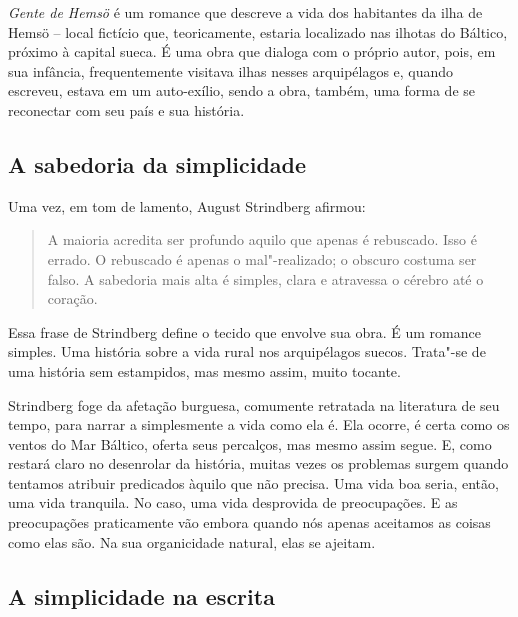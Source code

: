 \documentclass[12pt]{extarticle}
\begin{document}
\emph{Gente de Hemsö} é um romance que descreve a vida dos habitantes da 
ilha de Hemsö -- local fictício que, teoricamente, estaria localizado nas
ilhotas do Báltico, próximo à capital sueca. É uma obra que dialoga com
o próprio autor, pois, em sua infância, frequentemente visitava ilhas
nesses arquipélagos e, quando escreveu, estava em um auto-exílio, sendo
a obra, também, uma forma de se reconectar com seu país e sua história.




\subsection{A sabedoria da simplicidade}

Uma vez, em tom de lamento, August Strindberg afirmou:

\begin{quote}
A maioria acredita ser profundo aquilo que apenas é rebuscado. Isso é
errado. O rebuscado é apenas o mal"-realizado; o obscuro costuma ser
falso. A sabedoria mais alta é simples, clara e atravessa o cérebro até
o coração.
\end{quote}

Essa frase de Strindberg define o tecido que envolve sua obra. É um
romance simples. Uma história sobre a vida rural nos arquipélagos
suecos. Trata"-se de uma história sem estampidos, mas mesmo assim, muito
tocante.

Strindberg foge da afetação burguesa, comumente retratada na literatura
de seu tempo, para narrar a simplesmente a vida como ela é. Ela ocorre,
é certa como os ventos do Mar Báltico, oferta seus percalços, mas mesmo
assim segue. E, como restará claro no desenrolar da história, muitas
vezes os problemas surgem quando tentamos atribuir predicados àquilo que
não precisa. Uma vida boa seria, então, uma vida tranquila. No caso, uma
vida desprovida de preocupações. E as preocupações praticamente vão
embora quando nós apenas aceitamos as coisas como elas são. Na sua
organicidade natural, elas se ajeitam.




\subsection{A simplicidade na escrita}
\end{document}
